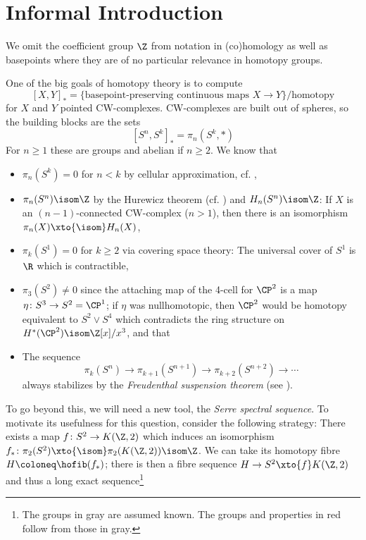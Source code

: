 \documentclass[wip, topology]{bsteffan-lecturenotes}
\begin{document}
\section{Informal Introduction}
\begin{note}
	We omit the coefficient group $\Z$ from notation in (co)homology as well as basepoints where they are of no particular relevance in homotopy groups.
\end{note}
One of the big goals of homotopy theory is to compute
\[
	[X, Y]_* = \{\text{basepoint-preserving continuous maps } X \to Y\} / \text{homotopy}
\]
for $X$ and $Y$ pointed CW-complexes.
CW-complexes are built out of spheres, so the building blocks are the sets
\[
	[S^n, S^k]_* = \pi_n(S^k, *)
\]
For $n \geq 1$ these are groups and abelian if $n \geq 2$.
We know that\textellipsis{}
\begin{itemize}
	\item $\pi_n(S^k) = 0$ for $n < k$ by cellular approximation, cf. \cite[Corollary 4.9]{hatcher_algebraic_2002},
	\item $\pi_n(S^n) \isom \Z$ by the Hurewicz theorem (cf. \cite[Theorem 4.32]{hatcher_algebraic_2002}) and $H_n(S^n) \isom \Z$: 
		If $X$ is an $(n - 1)$-connected CW-complex ($n > 1$), then there is an isomorphism $\pi_n(X) \xto{\isom} H_n(X)$, 
	\item $\pi_k(S^1) = 0$ for $k \geq 2$ via covering space theory: The universal cover of $S^1$ is $\R$ which is contractible, 
	\item $\pi_3(S^2) \neq 0$ since the attaching map of the 4-cell for $\CP^2$ is a map $\eta\colon S^3 \to S^2 = \CP^1$; if $\eta$ was nullhomotopic, then $\CP^2$ would be homotopy equivalent to $S^2 \vee S^4$ which contradicts the ring structure on $H^*(\CP^2) \isom \Z[x] / x^3$, and that
	\item The sequence
		\begin{equation*}
			\pi_k(S^n) \to \pi_{k + 1}(S^{n + 1}) \to \pi_{k + 2}(S^{n + 2}) \to \cdots
		\end{equation*}
		always stabilizes by the \emph{Freudenthal suspension theorem} (see \cite[Corollary 4.24]{hatcher_algebraic_2002}).
\end{itemize}
To go beyond this, we will need a new tool, the \emph{Serre spectral sequence}.
To motivate its usefulness for this question, consider the following strategy:
There exists a map $f\colon S^2 \to K(\Z, 2)$ which induces an isomorphism $f_*\colon \pi_2(S^2) \xto{\isom} \pi_2(K(\Z, 2)) \isom \Z$.
We can take its homotopy fibre $H \coloneq \hofib(f_*)$; there is then a fibre sequence $H \to S^2 \xto{f} K(\Z, 2)$ and thus a long exact sequence\footnote{The groups in \textcolor{knowngray}{gray} are assumed known. The groups and properties in \textcolor{col05}{red} follow from those in gray.}
\end{document}
